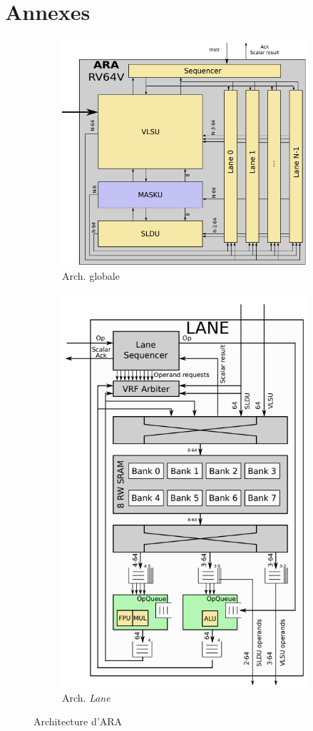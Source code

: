 \documentclass[11pt,letterpaper]{article}
\begin{document}
\section*{Annexes}
    \begin{figure}[H]
        \begin{subfigure}{.5\textwidth}
        \centering
        \includegraphics[width=1.1\linewidth]{ara_arch.png}
        \caption{Arch. globale}
        \label{fig:top_arch}
        \end{subfigure}%
        \begin{subfigure}{.5\textwidth}
        \centering
        \includegraphics[width=.65\linewidth]{lane_arch.png}
        \caption{Arch. \textit{Lane}}
        \label{fig:lane_arch}
        \end{subfigure}
        \caption{Architecture d'ARA}
        \label{fig:ara_arch}
    \end{figure}
\end{document}
